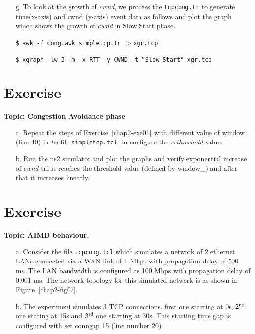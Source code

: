 \begin{multicols}{2}
\begin{itemize}
\item[g.] To look at the growth of \textit{cwnd}, we process the \texttt{tcpcong.tr} to generate time(x-axis) and cwnd (y-axis) event data as follows and plot the graph \cite{art2-key15} which shows the growth of \textit{cwnd} in Slow Start phase.

\texttt{\$  awk -f cong.awk simpletcp.tr $> $xgr.tcp}

\texttt{\$ xgraph -lw 3 -m -x RTT -y CWND -t ``Slow Start" xgr.tcp}
\end{itemize}

\section*{Exercise \label{chap2-exe02}}

\textbf{Topic: Congestion Avoidance phase}
\begin{itemize}

\item[a.] Repeat the steps of Exercise~\ref{chap2-exe01} with different value of window\_ (line 40) in \textit{tcl} file \texttt{simpletcp.tcl}, to configure the \textit{ssthreshold} value.

\item[b.] Run the ns2 simulator and plot the graphs and verify  exponential increase of \textit{cwnd} till it reaches the threshold value (defined by window\_) and after that it increases linearly.
\end{itemize}

\section*{Exercise \label{chap2-exe03}}

\textbf{Topic: AIMD behaviour.}

\begin{itemize}

\item[a.] Consider the file \texttt{tcpcong.tcl} which simulates a network of 2 ethernet LANs connected via a WAN link of 1 Mbps with propagation delay of 500 ms. The LAN bandwidth is configured as 100 Mbps with propagation delay of 0.001 ms. The network topology for this simulated network is as shown in Figure~\ref{chap2-fig07}.

\item[b.] The experiment simulates 3 TCP connections, first one starting at 0s, ${\rm 2}^{\text{nd}}$ one stating at 15s and ${\rm 3}^{\text{rd}}$ one starting at 30s. This starting time gap is configured with set conngap 15 (line number 20).


\end{itemize}
\end{multicols}
